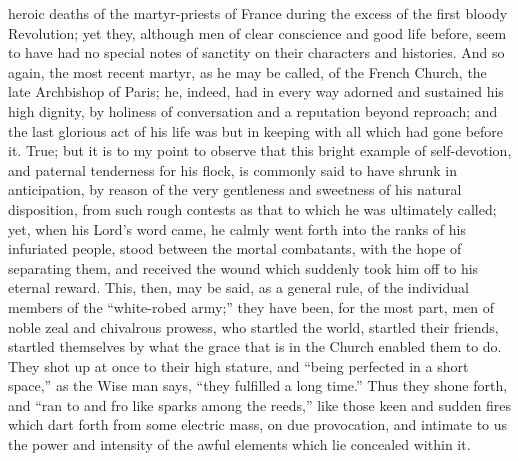 heroic deaths of the martyr-priests of France during the
excess of the first bloody Revolution; yet they, although
men of clear conscience and good life before, seem to
have had no special notes of sanctity on their characters
and histories. And so again, the most recent martyr, as
he may be called, of the French Church, the late
Archbishop of Paris; he, indeed, had in every way adorned
and sustained his high dignity, by holiness of
conversation and a reputation beyond reproach; and the
last glorious act of his life was but in keeping with all
which had gone before it. True; but it is to my point to
observe that this bright example of self-devotion, and
paternal tenderness for his flock, is commonly said to
have shrunk in anticipation, by reason of the very
gentleness and sweetness of his natural disposition, from
such rough contests as that to which he was ultimately
called; yet, when his Lord's word came, he calmly went
forth into the ranks of his infuriated people, stood
between the mortal combatants, with the hope of
separating them, and received the wound which suddenly
took him off to his eternal reward. This, then, may be
said, as a general rule, of the individual members of the
``white-robed army;'' they have been, for the
most part, men of noble zeal and chivalrous prowess, who
startled the world, startled their friends, startled
themselves by what the grace that is in the Church
enabled them to do. They shot up at once to their high
stature, and ``being perfected in a short
space,'' as the Wise man says, ``they fulfilled a
long time.'' Thus they shone forth, and ``ran to
and fro like sparks among the reeds,'' like those
keen and sudden fires which dart forth from some electric
mass, on due provocation, and intimate to us the power
and intensity of the awful elements which lie concealed
within it.

